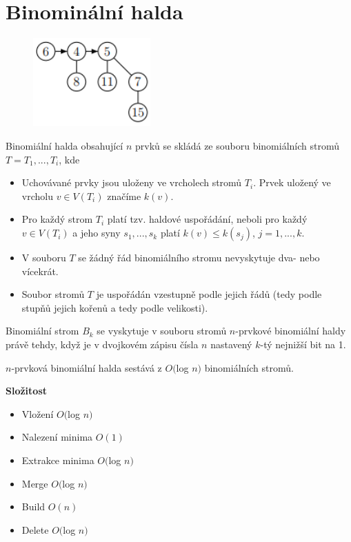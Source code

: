 \documentclass{szzclass}
\begin{document}
\newpage

\section{Binominální halda}

\begin{figure}[h]
\centering
\includegraphics[width=0.4\textwidth]{topics/bi-spol-05/images/binominal-heap.png}
\end{figure}

Binomiální halda obsahující $n$ prvků se skládá ze souboru
binomiálních stromů $T = T_1, . . . , T_i$, kde
\begin{itemize}
    \item Uchovávané prvky jsou uloženy ve vrcholech stromů $T_i$.
    Prvek uložený ve vrcholu $v \in V(T_i)$ značíme $k(v)$.
    \item  Pro každý strom $T_i$ platí tzv. haldové uspořádání, neboli pro
    každý $v \in V(T_i)$ a jeho syny $s_1, . . . , s_k$ platí $k(v) \leq k(s_j)$,
    $j = 1, . . . , k$.
    \item V souboru $T$ se žádný řád binomiálního stromu nevyskytuje
    dva- nebo vícekrát.
    \item Soubor stromů $T$ je uspořádán vzestupně podle jejich řádů
    (tedy podle stupňů jejich kořenů a tedy podle velikosti).
\end{itemize}

Binomiální strom $B_k$ se vyskytuje v souboru stromů $n$-prvkové
binomiální haldy právě tehdy, když je v dvojkovém zápisu čísla $n$
nastavený $k$-tý nejnižší bit na 1.

$n$-prvková binomiální halda sestává z $O($log $n)$ binomiálních stromů.


\textbf{Složitost}
\begin{itemize}
    \item Vložení $O($log $n)$
    \item Nalezení minima $O(1)$
    \item Extrakce minima $O($log $n)$
    \item Merge $O($log $n)$
    \item Build $O(n)$
    \item Delete $O($log $n)$
\end{itemize}
\end{document}
